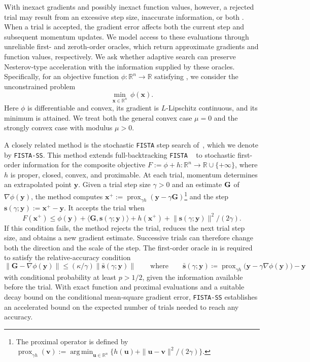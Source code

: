 \documentclass{article}
\begin{document}
With inexact gradients and possibly inexact function values, however, a rejected trial
may result from an excessive step size, inaccurate information, or both
\cite{stoFISTA,Bonettini2025Linesearch}. When a trial is accepted,
the gradient error affects both the current step and subsequent
momentum updates.
 We model access to these evaluations through unreliable first- and zeroth-order oracles, which return approximate gradients and function values, respectively. We ask whether adaptive search can preserve Nesterov-type acceleration with the information supplied by these oracles.
Specifically, for an objective function $\phi:\mathbb R^n\to\mathbb R$ satisfying , we consider the unconstrained problem
\[
\min_{\bm{x}\in\mathbb R^n}\,\phi(\bm{x}).
\]
Here \(\phi\) is differentiable and convex, its gradient is
\(L\)-Lipschitz continuous, and its minimum is attained.
We treat both the general convex case \(\mu=0\) and the
strongly convex case with modulus \(\mu>0\).

A closely related method is the {stochastic \texttt{FISTA} step search} of~\cite{stoFISTA}, which we denote by \texttt{FISTA-SS}. This method extends full-backtracking \texttt{FISTA} ~\cite{BKTR} to stochastic first-order information for the composite objective $F:=\phi+h:\mathbb R^n\to\mathbb R\cup\{+\infty\}$, where $h$ is proper, closed, convex, and proximable. At each trial, momentum determines an extrapolated point $\bm{y}$. Given a trial step size $\gamma>0$ and an estimate $\bf{G}$ of $\nabla\phi(\bm{y})$, the method computes $\bm{x}^+:=\operatorname{prox}_{\gamma h}(\bm{y}-\gamma\mathbf{G})$\footnote{%
The proximal operator is defined by
\(\operatorname{prox}_{\gamma h}(\bm{v})
:=\operatorname*{arg\,min}_{\bm{u}\in\mathbb{R}^n}
\{h(\bm{u})+\|\bm{u}-\bm{v}\|^2/(2\gamma)\}\).} and the step $\bm{s}(\gamma;\bm{y}):=\bm{x}^+-\bm{y}$. It accepts the trial when
\begin{equation}\label{eq:intro_fista_ss_acceptance}
F(\bm{x}^+)
\le
\phi(\bm{y})+\langle\mathbf{G},\bm{s}(\gamma;\bm{y})\rangle+h(\bm{x}^+)
+{\|\bm{s}(\gamma;\bm{y})\|^2}/{(2\gamma)}.
\end{equation}
If this condition fails, the method rejects the trial, reduces the next trial step size, and obtains a new gradient estimate. Successive trials can therefore change both the direction and the scale of the step.
The first-order oracle in \cite{stoFISTA} is required to satisfy the relative-accuracy condition
\[
\|\mathbf{G}-\nabla\phi(\bm{y})\|
\le
(\kappa/\gamma)\|\bar {\bm{s}}(\gamma;\bm{y})\|
\qquad\text{where}\qquad
\bar {\bm{s}}(\gamma;\bm{y})
\coloneqq 
\operatorname{prox}_{\gamma h}
\bigl(\bm{y}-\gamma\nabla\phi(\bm{y})\bigr)-\bm{y}
\]
with conditional probability at least $p>1/2$, given the information available before the trial. With exact function and proximal evaluations and a suitable decay bound on the conditional mean-square gradient error, \texttt{FISTA-SS} establishes an accelerated bound on the expected number of trials needed to reach any accuracy.
\end{document}
